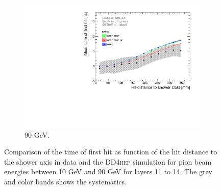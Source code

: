 \documentclass{JINST}
\newcommand\ddhep{\textsc{DD4hep}\xspace}
\begin{document}
\begin{figure}[htbp!]
\begin{subfigure}[t]{0.49\textwidth}
    \includegraphics[width=1\textwidth]{fig/Time_Radius_90GeV_BL_DD4hep.pdf}
    \caption{90 GeV.} \label{fig:Radius_BL_SimData_90GeV_DD4hep}
  \end{subfigure}
  \caption{Comparison of the time of first hit as function of the hit distance to the shower axis in data and the \ddhep simulation for pion beam energies between 10 GeV and 90 GeV for layers 11 to 14. The grey and color bands shows the systematics.}
  \label{fig:Radius_BL_SimData_Comparison_DD4hep}
\end{figure}
\end{document}
